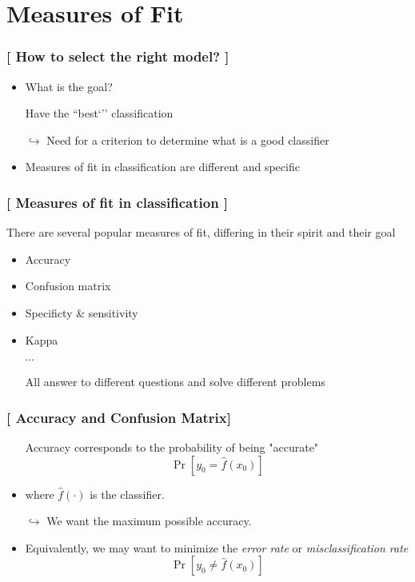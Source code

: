 \documentclass[xcolor=x11names,compress]{beamer}
\renewcommand{\(}{\begin{columns}}
\renewcommand{\)}{\end{columns}}
\newcommand{\<}[1]{\begin{column}{#1}}
\renewcommand{\>}{\end{column}}
\begin{document}
\section{Measures of Fit}

\begin{frame} %
\frametitle{\textcolor{brique}{[ How to select the right model?  ]}}
\pause
\begin{itemize}[<+->]
  \item What is the goal?
  \item[] Have the ``best`'' classification
  \item[$\hookrightarrow$] Need for a criterion to determine what is a good classifier
  \item Measures of fit in classification are different and specific
\end{itemize}
\end{frame}

\begin{frame} %
\frametitle{\textcolor{brique}{[ Measures of fit in classification ]}}
There are several popular measures of fit, differing in their spirit and their goal
\pause
\begin{itemize}[<+->]
  \item Accuracy
  \item Confusion matrix
  \item Specificty \& sensitivity
  \item Kappa
  \item[]$\cdots$
  \item[] All answer to different questions and solve different problems
\end{itemize}
\end{frame}

\begin{frame} %
\frametitle{\textcolor{brique}{[ Accuracy and Confusion Matrix]}}
\begin{itemize}[<+->]
  \item[] Accuracy corresponds to the probability of being "accurate"
        $$
        \Pr \left[ y_0  = \widehat{f}(x_0) \right]
        $$
    \item where $\widehat{f}(\cdot)$ is the classifier.
    \item[$\hookrightarrow$] We want the maximum possible accuracy.
    \item Equivalently, we may want to minimize the \textit{error rate} or \textit{misclassification rate}
    $$
    \Pr \left[ y_0  \neq \widehat{f}(x_0) \right]
    $$
\end{itemize}
\end{frame}
\end{document}
